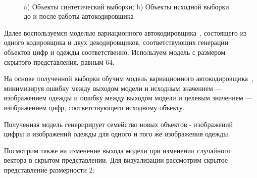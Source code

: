 \begin{figure}[h!t]\center
{}
\qquad
{}\\
\caption{a) Объекты синтетический выборки; b) Объекты исходной выборки до и после работы автокодировщика}
\end{figure}
Далее воспользуемся моделью вариационного автокодировщика~\cite{VAE}, состоящего из одного кодировщика и двух декодировщиков, соответствующих генерации объектов цифр и одежды соответственно. Используем модель с размером скрытого представления, равным 64.

На основе полученной выборки обучим модель вариационного автокодировщика~\cite{VAE}, минимизируя ошибку между выходом модели и исходным значением --- изображением одежды и ошибку между выходом модели и целевым значением --- изображением цифр, соответствующего исходному объекту.

Полученная модель генеририрует семейство новых объектов - изображений цифры и изображений одежды для одного и того же изображения одежды.

\newpage

Посмотрим также на изменение выхода модели при изменении случайного вектора в скрытом представлении. Для визуализации рассмотрим скрытое представление размерности 2:\\

